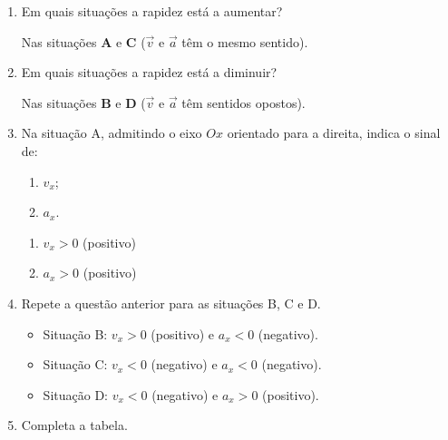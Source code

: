 \documentclass[11pt,a4paper]{article}
\begin{document}
	\begin{enumerate}[label=\textbf{\arabic*.},resume]
		
		\item Em quais situações a rapidez está a aumentar?
		
		\begin{solucao}
			Nas situações \textbf{A} e \textbf{C} ($\vec{v}$ e $\vec{a}$ têm o mesmo sentido).
		\end{solucao}
		
		\item Em quais situações a rapidez está a diminuir?
		
		\begin{solucao}
			Nas situações \textbf{B} e \textbf{D} ($\vec{v}$ e $\vec{a}$ têm sentidos opostos).
		\end{solucao}
		
		\item Na situação A, admitindo o eixo $Ox$ orientado para a direita, indica o
		sinal de:
		
		\begin{enumerate}[label=\alph*)]
			\item $v_x$;
			\item $a_x$.
		\end{enumerate}
		
		\begin{solucao}
			\begin{enumerate}[label=\alph*)]
				\item $v_x > 0$ (positivo)
				\item $a_x > 0$ (positivo)
			\end{enumerate}
		\end{solucao}
		
		\item Repete a questão anterior para as situações B, C e D.
		
		\begin{solucao}
			\begin{itemize}
				\item Situação B: $v_x > 0$ (positivo) e $a_x < 0$ (negativo).
				\item Situação C: $v_x < 0$ (negativo) e $a_x < 0$ (negativo).
				\item Situação D: $v_x < 0$ (negativo) e $a_x > 0$ (positivo).
			\end{itemize}
		\end{solucao}
		
		\item Completa a tabela.
		

\end{enumerate}
\end{document}
